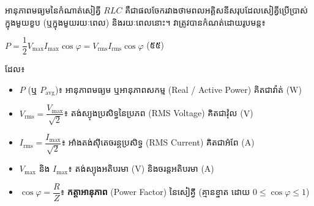 
\vspace{0.2em}
\noindent
អានុភាពមធ្យមនៃកំណាត់សៀគ្វី $RLC$ គឺជាផលចែករវាងថាមពលអគ្គិសនីសរុបដែលសៀគ្វីប្រើប្រាស់ក្នុងមួយខួប (ឬក្នុងមួយរយៈពេល) និងរយៈពេលនោះ។ វាត្រូវបានកំណត់ដោយរូបមន្ត៖

\begin{center}
	$\boxed{P = \dfrac{1}{2} V_{\max} I_{\max} \cos\varphi = V_{\mathrm{rms}} I_{\mathrm{rms}} \cos\varphi}$ \quad (៥៥)
\end{center}

\noindent
ដែល៖
\begin{itemize}[itemsep=2pt, topsep=2pt, leftmargin=1.6em]
	\item $P$ (ឬ $P_{\mathrm{avg}}$)៖ អានុភាពមធ្យម ឬអានុភាពសកម្ម ({\englishfont Real / Active Power}) គិតជាវ៉ាត់ ($\text{W}$)
	\item $V_{\mathrm{rms}} = \dfrac{V_{\max}}{\sqrt{2}}$៖ តង់ស្យុងប្រសិទ្ធនៃប្រភព ({\englishfont RMS Voltage}) គិតជាវ៉ុល ($\text{V}$)
	\item $I_{\mathrm{rms}} = \dfrac{I_{\max}}{\sqrt{2}}$៖ អាំងតង់ស៊ីតេចរន្តប្រសិទ្ធ ({\englishfont RMS Current}) គិតជាអំពែ ($\text{A}$)
	\item $V_{\max}$ និង $I_{\max}$៖ តង់ស្យុងអតិបរមា ($\text{V}$) និងចរន្តអតិបរមា ($\text{A}$)
	\item $\cos\varphi = \dfrac{R}{Z}$៖ \textbf{កត្តាអានុភាព} ({\englishfont Power Factor}) នៃសៀគ្វី (គ្មានខ្នាត ដោយ $0 \le \cos\varphi \le 1$)
\end{itemize}

\vspace{0.2em}


